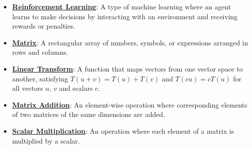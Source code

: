 \documentclass{article}%
\begin{document}
\begin{itemize}[leftmargin=*]
\item \href{https://purdue.brightspace.com/d2l/common/assets/pdfjs-d2l-dist/1.0.14-legacy/web/viewer.html?file=\%2Fcontent\%2Fenforced\%2F1095467-wl.202510.CS.24300.001\%2F02L2-Intro.pdf\%3Fou\%3D1095467\&lang=en-us\&container=d2l-fileviewer-rendered-pdf\&fullscreen=d2l-fileviewer-rendered-pdf-dialog\&height=667#page=46}{\textbf{Reinforcement Learning}}: A type of machine learning where an agent learns to make decisions by interacting with an environment and receiving rewards or penalties.%
\end{itemize}%
\begin{itemize}[leftmargin=*]%
\item \href{https://purdue.brightspace.com/d2l/common/assets/pdfjs-d2l-dist/1.0.14-legacy/web/viewer.html?file=\%2Fcontent\%2Fenforced\%2F1095467-wl.202510.CS.24300.001\%2F04L1-Linear Algebra Primer.pdf\%3Fou\%3D1095467\&lang=en-us\&container=d2l-fileviewer-rendered-pdf\&fullscreen=d2l-fileviewer-rendered-pdf-dialog\&height=667#page=4}{\textbf{Matrix}}: A rectangular array of numbers, symbols, or expressions arranged in rows and columns.%
\item \href{https://purdue.brightspace.com/d2l/common/assets/pdfjs-d2l-dist/1.0.14-legacy/web/viewer.html?file=\%2Fcontent\%2Fenforced\%2F1095467-wl.202510.CS.24300.001\%2F04L1-Linear Algebra Primer.pdf\%3Fou\%3D1095467\&lang=en-us\&container=d2l-fileviewer-rendered-pdf\&fullscreen=d2l-fileviewer-rendered-pdf-dialog\&height=667#page=5}{\textbf{Linear Transform}}: A function that maps vectors from one vector space to another, satisfying $T(u + v) = T(u) + T(v)$ and $T(cu) = cT(u)$ for all vectors $u$, $v$ and scalars $c$.%
\item \href{https://purdue.brightspace.com/d2l/common/assets/pdfjs-d2l-dist/1.0.14-legacy/web/viewer.html?file=\%2Fcontent\%2Fenforced\%2F1095467-wl.202510.CS.24300.001\%2F04L1-Linear Algebra Primer.pdf\%3Fou\%3D1095467\&lang=en-us\&container=d2l-fileviewer-rendered-pdf\&fullscreen=d2l-fileviewer-rendered-pdf-dialog\&height=667#page=9}{\textbf{Matrix Addition}}: An element-wise operation where corresponding elements of two matrices of the same dimensions are added.%
\item \href{https://purdue.brightspace.com/d2l/common/assets/pdfjs-d2l-dist/1.0.14-legacy/web/viewer.html?file=\%2Fcontent\%2Fenforced\%2F1095467-wl.202510.CS.24300.001\%2F04L1-Linear Algebra Primer.pdf\%3Fou\%3D1095467\&lang=en-us\&container=d2l-fileviewer-rendered-pdf\&fullscreen=d2l-fileviewer-rendered-pdf-dialog\&height=667#page=9}{\textbf{Scalar Multiplication}}: An operation where each element of a matrix is multiplied by a scalar.%

\end{itemize}
\end{document}
